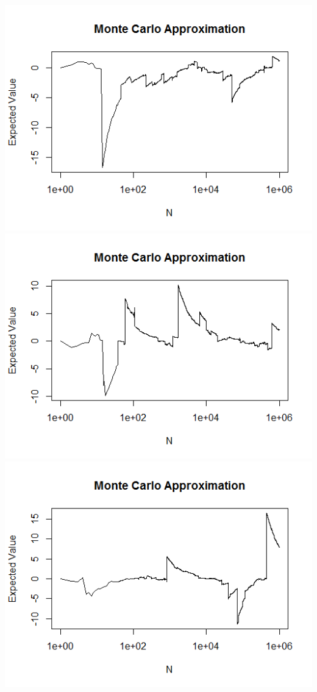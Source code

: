 \documentclass{article}
\begin{document}
\begin{enumerate}
\includegraphics[scale=0.4]{img1.png}
\includegraphics[scale=0.4]{img2.png}\\
\includegraphics[scale=0.4]{img3.png}

\end{enumerate}
\end{document}
